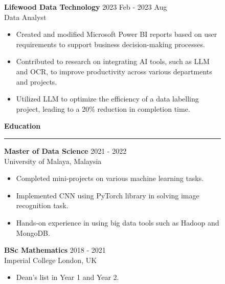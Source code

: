 \documentclass[a4paper, 10pt]{article}
\newcommand{\rhsWidth}{0.65\textwidth}
\newenvironment{expSection}[3]{%
    \textbf{#1} \hfill {#2} \\
    #3
	\vspace{-6pt}
}{}
\begin{document}
\begin{figure}[h]
\begin{minipage}[t]{\rhsWidth}
	\vspace{0.5em}

	\begin{expSection} {Lifewood Data Technology} {2023 Feb - 2023 Aug} {Data Analyst}
		\begin{itemize} [itemsep = 0pt, parsep=2pt]
			\item Created and modified Microsoft Power BI reports based on user requirements to support business decision-making processes.
			\item Contributed to research on integrating AI tools, such as LLM and OCR, to improve productivity across various departments and projects.
			\item Utilized LLM to optimize the efficiency of a data labelling project, leading to a 20\% reduction in completion time.
		\end{itemize}
	\end{expSection}

	\vspace{1.5em}
	
	{\Large \faGraduationCap \hspace{3pt} \textbf{Education}} \newline
	\rule [6pt]{\linewidth}{1pt}
	\vspace{-15pt}
	
	\begin{expSection} {Master of Data Science} {2021 - 2022} {University of Malaya, Malaysia}
		\begin{itemize} [itemsep = 0pt, parsep=2pt]
			\item Completed mini-projects on various machine learning tasks.
			\item Implemented CNN using PyTorch library in solving image recognition task.
			\item Hands-on experience in using big data tools such as Hadoop and MongoDB.
		\end{itemize}
	\end{expSection}
	
	\vspace{0.5em}
	
	\begin{expSection} {BSc Mathematics} {2018 - 2021} {Imperial College London, UK}
		\begin{itemize} [itemsep = 0pt, parsep=2pt]
			\item Dean's list in Year 1 and Year 2.
		\end{itemize}
	\end{expSection}
	

\end{minipage}
\end{figure}
\end{document}
